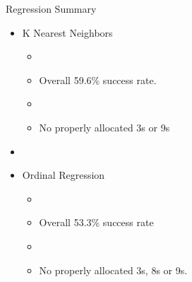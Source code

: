 \documentclass{beamer}
\begin{document}
\begin{frame}{Regression Summary}
	\begin{itemize}
	\item K Nearest Neighbors
	\begin{itemize}
		\item[]
		\item Overall 59.6\% success rate.
		\item[]
		\item No properly allocated 3s or 9s
	\end{itemize}
	\item[]
	\item Ordinal Regression
	\begin{itemize}
		\item[]	
		\item Overall 53.3\% success rate
		\item[]		
		\item No properly allocated 3s, 8s or 9s.
	\end{itemize}
	
	\end{itemize}

\end{frame}

%
\end{document}
